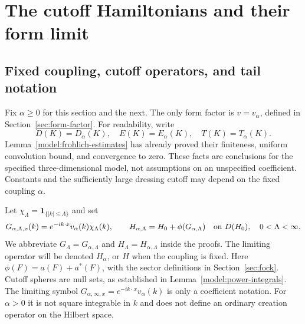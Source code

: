 \documentclass[11pt,a4paper]{article}
\theoremstyle{definition}
\theoremstyle{remark}
\begin{document}
\section{The cutoff Hamiltonians and their form limit}
\label{sec:construction}

\subsection{Fixed coupling, cutoff operators, and tail notation}

Fix $\alpha\geq0$ for this section and the next. The only form factor is
$v=v_\alpha$, defined in Section~\ref{sec:form-factor}. For readability,
write
\[
 D(K)=D_\alpha(K),\quad E(K)=E_\alpha(K),\quad T(K)=T_\alpha(K).
\]
Lemma~\ref{model:frohlich-estimates} has already proved their finiteness,
uniform convolution bound, and convergence to zero. These facts are
conclusions for the specified three-dimensional model, not assumptions
on an unspecified coefficient. Constants and the sufficiently large
dressing cutoff may depend on the fixed coupling $\alpha$.

Let $\chi_\Lambda=\mathbf1_{\{|k|\leq\Lambda\}}$ and set
\[
 G_{\alpha,\Lambda,x}(k)=e^{-ik\cdot x}v_\alpha(k)\chi_\Lambda(k),
 \qquad H_{\alpha,\Lambda}=H_0+\phi(G_{\alpha,\Lambda})
       \quad\hbox{on }D(H_0),\quad0<\Lambda<\infty.
\]
We abbreviate $G_\Lambda=G_{\alpha,\Lambda}$ and
$H_\Lambda=H_{\alpha,\Lambda}$ inside the proofs. The limiting operator
will be denoted $H_\alpha$, or $H$ when the coupling is fixed.
Here $\phi(F)=a(F)+a^*(F)$, with the sector definitions in
Section~\ref{sec:fock}. Cutoff spheres are null sets, as established in
Lemma~\ref{model:power-integrals}. The limiting symbol
$G_{\alpha,\infty,x}=e^{-ik\cdot x}v_\alpha(k)$ is only a coefficient
notation. For $\alpha>0$ it is not square integrable in $k$ and does
not define an ordinary creation operator on the Hilbert space.
\end{document}
